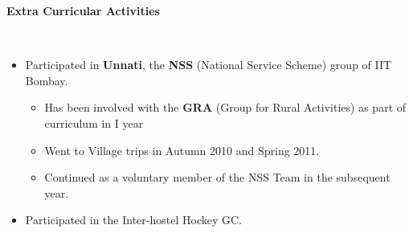 \documentclass[a4paper,11pt]{article}
\newcommand{\isep}{-2 pt}
\newcommand{\lsep}{-0.5cm}
\newcommand{\resheading}[1]{{\small \colorbox{mygrey}{\begin{minipage}{0.975\textwidth}{\textbf{#1 \vphantom{p\^{E}}}}\end{minipage}}}}
\begin{document}
\begin{comment}
\resheading{\textbf{\large Misc. Technical Activities}}\\[\lsep]
\begin{itemize}
 \item Trackmania-2010
    \begin{itemize}
        \item Built a remote-controlled four-wheeled car (bot). 
        \item Designed the circuit and soldered it. 
    \end{itemize}
 \item Participated in Line-follower competition-2011.
    \begin{itemize}
        \item Designed and built a line-following bot.
        \item Used IR sensors and Coded the microcontroller using Arduino software.
    \end{itemize}
 \item Yahoo! HackU -2012: Built an android app and web interface, 'MapIt' which can be used to create customizable maps of localities with greater information\\[-0.7cm]
 \item Line-follower competition-2011 : Designed and built a line-following bot using IR sensors and coding the microcontroller using Arduino software\\[-0.7cm]
\item Trackmania-2010 : Built a remote-controlled differential drive land bot.
\end{itemize}
\end{comment}

\resheading{\textbf{\large Extra Curricular Activities}}\\[\lsep]
\begin{itemize}\itemsep \isep
        \item Participated in \textbf{Unnati}, the \textbf{NSS} (National Service Scheme) group of IIT Bombay. \\[-0.6cm]
    \begin{itemize} 
     \item Has been involved with the \textbf{GRA} (Group for Rural Activities) as part of curriculum in I year\\[-0.6cm]
     \item Went to Village trips in Autumn 2010 and Spring 2011.\\[-0.6cm]
     \item Continued as a voluntary member of the NSS Team in the subsequent year.
      \end{itemize}
  \item Participated in the Inter-hostel Hockey GC. 
\end{itemize}
    
\end{document}
